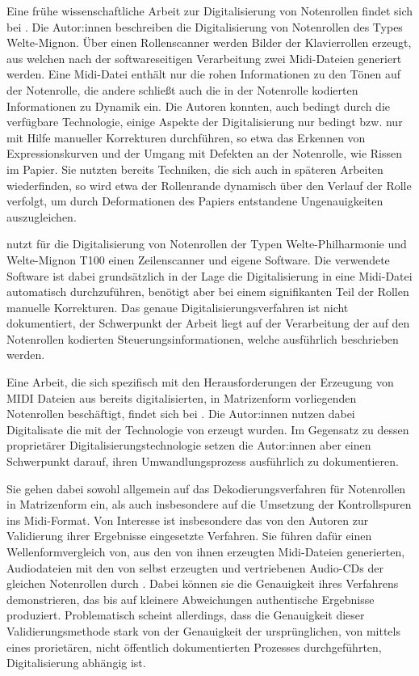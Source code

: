 Eine frühe wissenschaftliche Arbeit zur Digitalisierung von Notenrollen findet sich bei \textcite[]{zoltan_1994}.
Die Autor:innen beschreiben die Digitalisierung von Notenrollen des Types Welte-Mignon.
Über einen Rollenscanner werden Bilder der Klavierrollen erzeugt, aus welchen nach der softwareseitigen Verarbeitung zwei Midi-Dateien generiert werden.
Eine Midi-Datei enthält nur die rohen Informationen zu den Tönen auf der Notenrolle, die andere schließt auch die in der Notenrolle kodierten Informationen zu Dynamik ein.
Die Autoren konnten, auch bedingt durch die verfügbare Technologie, einige Aspekte der Digitalisierung nur bedingt bzw. nur mit Hilfe manueller Korrekturen durchführen, so etwa das Erkennen von Expressionskurven und der Umgang mit Defekten an der Notenrolle, wie Rissen im Papier.
Sie nutzten bereits Techniken, die sich auch in späteren Arbeiten wiederfinden, so wird etwa der Rollenrande dynamisch über den Verlauf der Rolle verfolgt, um durch Deformationen des Papiers entstandene Ungenauigkeiten auszugleichen.

\textcite[]{debrunner_201300} nutzt für die Digitalisierung von Notenrollen der Typen Welte-Philharmonie und Welte-Mignon T100 einen Zeilenscanner und eigene Software.
Die verwendete Software ist dabei grundsätzlich in der Lage die Digitalisierung in eine Midi-Datei automatisch durchzuführen, benötigt aber bei einem signifikanten Teil der Rollen manuelle Korrekturen.
Das genaue Digitalisierungsverfahren ist nicht dokumentiert, der Schwerpunkt der Arbeit liegt auf der Verarbeitung der auf den Notenrollen kodierten Steuerungsinformationen, welche ausführlich beschrieben werden.

Eine Arbeit, die sich spezifisch mit den Herausforderungen der Erzeugung von MIDI Dateien aus bereits digitalisierten, in Matrizenform vorliegenden Notenrollen beschäftigt, findet sich bei \textcite[]{colmenares_2011}.
Die Autor:innen nutzen dabei Digitalisate die mit der Technologie von \textcite[]{stahnke_1996} erzeugt wurden.
Im Gegensatz zu dessen proprietärer Digitalisierungstechnologie setzen die Autor:innen aber einen Schwerpunkt darauf, ihren Umwandlungsprozess ausführlich zu dokumentieren.

Sie gehen dabei sowohl allgemein auf das Dekodierungsverfahren für Notenrollen in Matrizenform ein, als auch insbesondere auf die Umsetzung der Kontrollspuren ins Midi-Format.
Von Interesse ist insbesondere das von den Autoren zur Validierung ihrer Ergebnisse eingesetzte Verfahren.
Sie führen dafür einen Wellenformvergleich von, aus den von ihnen erzeugten Midi-Dateien generierten, Audiodateien mit den von \textcite[]{stahnke_1996} selbst erzeugten und vertriebenen Audio-CDs der gleichen Notenrollen durch \parencite[70-72]{colmenares_2011}.
Dabei können sie die Genauigkeit ihres Verfahrens demonstrieren, das bis auf kleinere Abweichungen authentische Ergebnisse produziert.
Problematisch scheint allerdings, dass die Genauigkeit dieser Validierungsmethode stark von der Genauigkeit der ursprünglichen, von \textcite[]{stahnke_1996} mittels eines prorietären, nicht öffentlich dokumentierten Prozesses durchgeführten, Digitalisierung abhängig ist.

